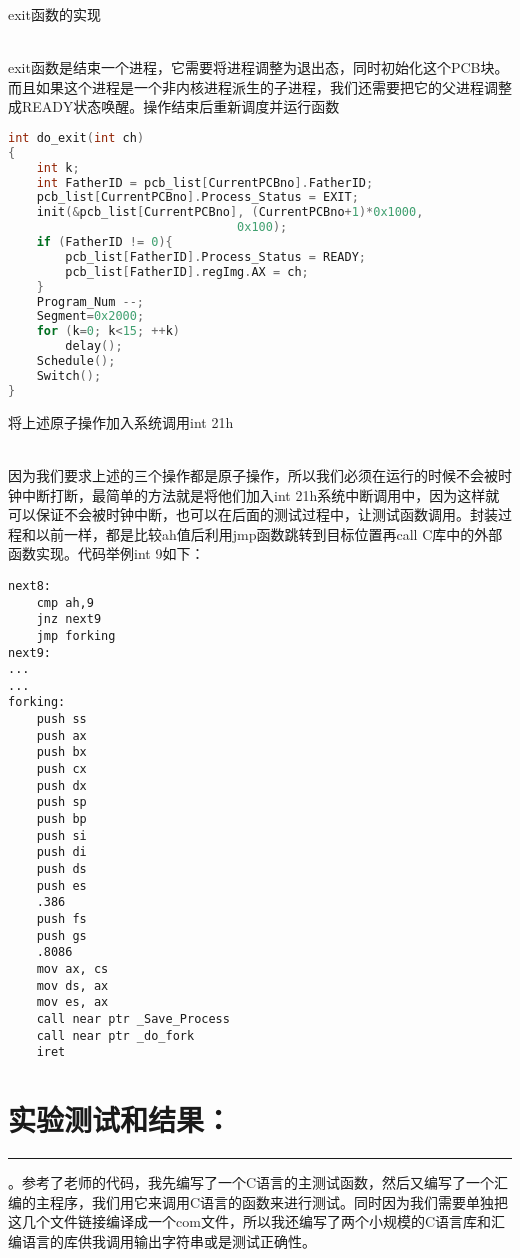 \documentclass[UTF8]{article}
\begin{document}
{\begin{enumerate}[1)]
{\bfseries\item exit函数的实现}
\\exit函数是结束一个进程，它需要将进程调整为退出态，同时初始化这个PCB块。而且如果这个进程是一个非内核进程派生的子进程，我们还需要把它的父进程调整成READY状态唤醒。操作结束后重新调度并运行函数
\begin{lstlisting}[language={C}]
int do_exit(int ch)
{
    int k;
    int FatherID = pcb_list[CurrentPCBno].FatherID;
    pcb_list[CurrentPCBno].Process_Status = EXIT;
    init(&pcb_list[CurrentPCBno], (CurrentPCBno+1)*0x1000,
    							0x100);
    if (FatherID != 0){
        pcb_list[FatherID].Process_Status = READY;
        pcb_list[FatherID].regImg.AX = ch;
    }
    Program_Num --;
    Segment=0x2000;
    for (k=0; k<15; ++k)
        delay();
    Schedule();
    Switch();
}
\end{lstlisting}


{\bfseries\item 将上述原子操作加入系统调用int 21h}
\\ 因为我们要求上述的三个操作都是原子操作，所以我们必须在运行的时候不会被时钟中断打断，最简单的方法就是将他们加入int 21h系统中断调用中，因为这样就可以保证不会被时钟中断，也可以在后面的测试过程中，让测试函数调用。封装过程和以前一样，都是比较ah值后利用jmp函数跳转到目标位置再call C库中的外部函数实现。代码举例int 9如下：
\begin{lstlisting}[language={[x86masm]Assembler}]
next8:
    cmp ah,9
    jnz next9
    jmp forking
next9:
...
...
forking:
    push ss                             
    push ax
    push bx
    push cx
    push dx
    push sp
    push bp
    push si
    push di
    push ds
    push es
    .386
    push fs
    push gs
    .8086
    mov ax, cs       
    mov ds, ax
    mov es, ax
    call near ptr _Save_Process
    call near ptr _do_fork
    iret 
\end{lstlisting}

\end{enumerate}
}
\section{实验测试和结果：}
\noindent\rule[0.2\baselineskip]{\textwidth}{0.5pt}
。参考了老师的代码，我先编写了一个C语言的主测试函数，然后又编写了一个汇编的主程序，我们用它来调用C语言的函数来进行测试。同时因为我们需要单独把这几个文件链接编译成一个com文件，所以我还编写了两个小规模的C语言库和汇编语言的库供我调用输出字符串或是测试正确性。
\end{document}
